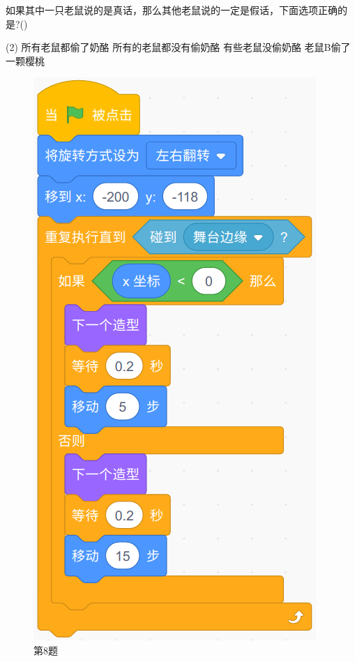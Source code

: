 \documentclass[10pt, a4paper]{article}
\begin{document}
\begin{enumerate}
        如果其中一只老鼠说的是真话，那么其他老鼠说的一定是假话，下面选项正确的是?(\qquad)
        \begin{tasks}(2)
            \task 所有老鼠都偷了奶酪
            \task 所有的老鼠都没有偷奶酪
            \task 有些老鼠没偷奶酪
            \task 老鼠B偷了一颗樱桃
        \end{tasks}

        \begin{figure}[htbp]
            \centering
            \begin{minipage}[t]{.23\textwidth}
                \centering
                \includegraphics[width=.7\textwidth]{8.png}
                \caption*{第8题}
            \end{minipage}
            \begin{minipage}[t]{.23\textwidth}
                \centering

\end{minipage}
\end{figure}
\end{enumerate}
\end{document}
